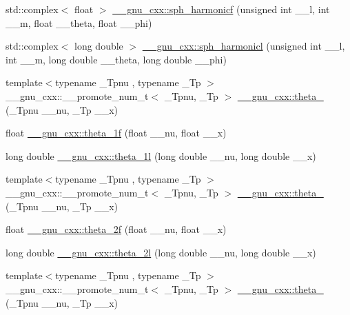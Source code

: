 \begin{DoxyCompactItemize}
\item 
std\+::complex$<$ float $>$ \hyperlink{group__gnu__math__spec__func_ga062b1156f5646fe42719439bb3dcc9e5}{\+\_\+\+\_\+gnu\+\_\+cxx\+::sph\+\_\+harmonicf} (unsigned int \+\_\+\+\_\+l, int \+\_\+\+\_\+m, float \+\_\+\+\_\+theta, float \+\_\+\+\_\+phi)
\item 
std\+::complex$<$ long double $>$ \hyperlink{group__gnu__math__spec__func_ga414c8374b4579aa14e38f5401304b6fa}{\+\_\+\+\_\+gnu\+\_\+cxx\+::sph\+\_\+harmonicl} (unsigned int \+\_\+\+\_\+l, int \+\_\+\+\_\+m, long double \+\_\+\+\_\+theta, long double \+\_\+\+\_\+phi)
\item 
{\footnotesize template$<$typename \+\_\+\+Tpnu , typename \+\_\+\+Tp $>$ }\\\+\_\+\+\_\+gnu\+\_\+cxx\+::\+\_\+\+\_\+promote\+\_\+num\+\_\+t$<$ \+\_\+\+Tpnu, \+\_\+\+Tp $>$ \hyperlink{group__gnu__math__spec__func_ga936eef7d11580bef855f98789bbbfe50}{\+\_\+\+\_\+gnu\+\_\+cxx\+::theta\+\_} (\+\_\+\+Tpnu \+\_\+\+\_\+nu, \+\_\+\+Tp \+\_\+\+\_\+x)
\item 
float \hyperlink{group__gnu__math__spec__func_ga5bbf256b875da28132f9049f5984cb14}{\+\_\+\+\_\+gnu\+\_\+cxx\+::theta\+\_\+1f} (float \+\_\+\+\_\+nu, float \+\_\+\+\_\+x)
\item 
long double \hyperlink{group__gnu__math__spec__func_ga3520684c78771ffa57180060c8b6d1ca}{\+\_\+\+\_\+gnu\+\_\+cxx\+::theta\+\_\+1l} (long double \+\_\+\+\_\+nu, long double \+\_\+\+\_\+x)
\item 
{\footnotesize template$<$typename \+\_\+\+Tpnu , typename \+\_\+\+Tp $>$ }\\\+\_\+\+\_\+gnu\+\_\+cxx\+::\+\_\+\+\_\+promote\+\_\+num\+\_\+t$<$ \+\_\+\+Tpnu, \+\_\+\+Tp $>$ \hyperlink{group__gnu__math__spec__func_ga762aa79fc6c6320d7c6290359a42c2bc}{\+\_\+\+\_\+gnu\+\_\+cxx\+::theta\+\_} (\+\_\+\+Tpnu \+\_\+\+\_\+nu, \+\_\+\+Tp \+\_\+\+\_\+x)
\item 
float \hyperlink{group__gnu__math__spec__func_ga78e832796aedf5159b142801e1184392}{\+\_\+\+\_\+gnu\+\_\+cxx\+::theta\+\_\+2f} (float \+\_\+\+\_\+nu, float \+\_\+\+\_\+x)
\item 
long double \hyperlink{group__gnu__math__spec__func_gac5a30c772d4888442665945e7f3fa017}{\+\_\+\+\_\+gnu\+\_\+cxx\+::theta\+\_\+2l} (long double \+\_\+\+\_\+nu, long double \+\_\+\+\_\+x)
\item 
{\footnotesize template$<$typename \+\_\+\+Tpnu , typename \+\_\+\+Tp $>$ }\\\+\_\+\+\_\+gnu\+\_\+cxx\+::\+\_\+\+\_\+promote\+\_\+num\+\_\+t$<$ \+\_\+\+Tpnu, \+\_\+\+Tp $>$ \hyperlink{group__gnu__math__spec__func_ga1383b7486de1e177f19c45411ed957c3}{\+\_\+\+\_\+gnu\+\_\+cxx\+::theta\+\_} (\+\_\+\+Tpnu \+\_\+\+\_\+nu, \+\_\+\+Tp \+\_\+\+\_\+x)

\end{DoxyCompactItemize}
